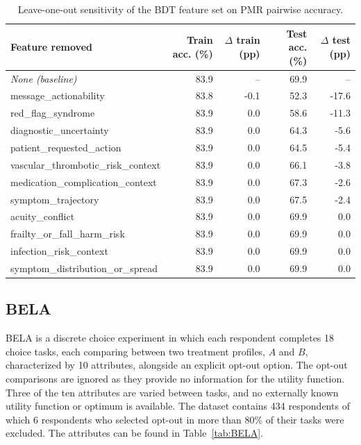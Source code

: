 \documentclass{article}
\begin{document}
\begin{table}[htbp]
\centering
\begin{tabular}{lrrrr}
\toprule
Feature removed & Train acc. (\%) & $\Delta$ train (pp) & Test acc. (\%) & $\Delta$ test (pp) \\
\midrule
\emph{None (baseline)} & 83.9 & -- & 69.9 & -- \\
message\_actionability & 83.8 & -0.1 & 52.3 & -17.6 \\
red\_flag\_syndrome & 83.9 & 0.0 & 58.6 & -11.3 \\
diagnostic\_uncertainty & 83.9 & 0.0 & 64.3 & -5.6 \\
patient\_requested\_action & 83.9 & 0.0 & 64.5 & -5.4 \\
vascular\_thrombotic\_risk\_context & 83.9 & 0.0 & 66.1 & -3.8 \\
medication\_complication\_context & 83.9 & 0.0 & 67.3 & -2.6 \\
symptom\_trajectory & 83.9 & 0.0 & 67.5 & -2.4 \\
acuity\_conflict & 83.9 & 0.0 & 69.9 & 0.0 \\
frailty\_or\_fall\_harm\_risk & 83.9 & 0.0 & 69.9 & 0.0 \\
infection\_risk\_context & 83.9 & 0.0 & 69.9 & 0.0 \\
symptom\_distribution\_or\_spread & 83.9 & 0.0 & 69.9 & 0.0 \\
\bottomrule
\end{tabular}
\caption{Leave-one-out sensitivity of the BDT feature set on PMR pairwise accuracy.}
\label{tab:pmr-bdt-loo-sensitivity}
\end{table}

\subsection{BELA}
\label{appendix:bela}
BELA \citep{mandrik2019population} is a discrete choice experiment in which each respondent completes 18 choice tasks, each comparing between two treatment profiles, $A$ and $B$, characterized by 10 attributes, alongside an explicit opt-out option. The opt-out comparisons are ignored as they provide no information for the utility function. Three of the ten attributes are varied between tasks, and no externally known utility function or optimum is available. The dataset contains 434 respondents of which 6 respondents who selected opt-out in more than 80\% of their tasks were excluded. The attributes can be found in Table~\ref{tab:BELA}. 
\end{document}
